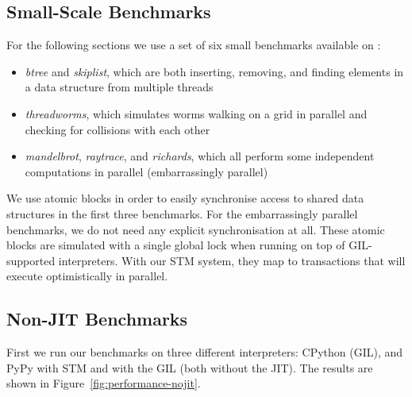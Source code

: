 \documentclass{sigplanconf}
\newcommand{\mynote}[2]{%
  \textcolor{red}{%
    \fbox{\bfseries\sffamily\scriptsize#1}%
    {\small$\blacktriangleright$\textsf{\emph{#2}}$\blacktriangleleft$}%
  }%
}
\newcommand\remi[1]{\mynote{Remi}{#1}}
\begin{document}
\subsection{Small-Scale Benchmarks\label{sec:performance-bench}}

For the following sections we use a set of six small benchmarks
available on \cite{pypybenchs}:

\begin{itemize}
\item \emph{btree} and \emph{skiplist}, which are both inserting,
  removing, and finding elements in a data structure from multiple
  threads
\item \emph{threadworms}, which simulates worms walking on a grid in
  parallel and checking for collisions with each other
\item \emph{mandelbrot}, \emph{raytrace}, and \emph{richards}, which
  all perform some independent computations in parallel (embarrassingly
  parallel)
\end{itemize}

We use atomic blocks in order to easily synchronise access to shared
data structures in the first three benchmarks. For the embarrassingly
parallel benchmarks, we do not need any explicit synchronisation at
all. These atomic blocks are simulated with a single global lock
when running on top of GIL-supported interpreters. With our STM
system, they map to transactions that will execute optimistically
in parallel.









\subsection{Non-JIT Benchmarks}
First we run our benchmarks on three different interpreters: CPython
(GIL), and PyPy with STM and with the GIL (both without the JIT). The
results are shown in Figure~\ref{fig:performance-nojit}.
\end{document}
